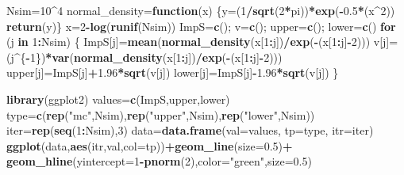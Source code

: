 \documentclass[]{book}
\newenvironment{Shaded}{\begin{snugshade}}{\end{snugshade}}
\newcommand{\KeywordTok}[1]{\textcolor[rgb]{0.13,0.29,0.53}{\textbf{#1}}}
\newcommand{\DataTypeTok}[1]{\textcolor[rgb]{0.13,0.29,0.53}{#1}}
\newcommand{\DecValTok}[1]{\textcolor[rgb]{0.00,0.00,0.81}{#1}}
\newcommand{\FloatTok}[1]{\textcolor[rgb]{0.00,0.00,0.81}{#1}}
\newcommand{\StringTok}[1]{\textcolor[rgb]{0.31,0.60,0.02}{#1}}
\newcommand{\ControlFlowTok}[1]{\textcolor[rgb]{0.13,0.29,0.53}{\textbf{#1}}}
\newcommand{\OperatorTok}[1]{\textcolor[rgb]{0.81,0.36,0.00}{\textbf{#1}}}
\newcommand{\NormalTok}[1]{#1}
\begin{document}
\begin{Shaded}
\begin{Highlighting}[]
\NormalTok{Nsim=}\DecValTok{10}\OperatorTok{^}\DecValTok{4}
\NormalTok{normal_density=}\ControlFlowTok{function}\NormalTok{(x)}
\NormalTok{\{y=(}\DecValTok{1}\OperatorTok{/}\KeywordTok{sqrt}\NormalTok{(}\DecValTok{2}\OperatorTok{*}\NormalTok{pi))}\OperatorTok{*}\KeywordTok{exp}\NormalTok{(}\OperatorTok{-}\FloatTok{0.5}\OperatorTok{*}\NormalTok{(x}\OperatorTok{^}\DecValTok{2}\NormalTok{))}
\KeywordTok{return}\NormalTok{(y)\}}
\NormalTok{x=}\DecValTok{2}\OperatorTok{-}\KeywordTok{log}\NormalTok{(}\KeywordTok{runif}\NormalTok{(Nsim))}
\NormalTok{ImpS=}\KeywordTok{c}\NormalTok{(); v=}\KeywordTok{c}\NormalTok{(); upper=}\KeywordTok{c}\NormalTok{(); lower=}\KeywordTok{c}\NormalTok{()}
\ControlFlowTok{for}\NormalTok{ (j }\ControlFlowTok{in} \DecValTok{1}\OperatorTok{:}\NormalTok{Nsim)}
\NormalTok{\{}
\NormalTok{ImpS[j]=}\KeywordTok{mean}\NormalTok{(}\KeywordTok{normal_density}\NormalTok{(x[}\DecValTok{1}\OperatorTok{:}\NormalTok{j])}\OperatorTok{/}\KeywordTok{exp}\NormalTok{(}\OperatorTok{-}\NormalTok{(x[}\DecValTok{1}\OperatorTok{:}\NormalTok{j]}\OperatorTok{-}\DecValTok{2}\NormalTok{)))}
\NormalTok{v[j]=(j}\OperatorTok{^}\NormalTok{\{}\OperatorTok{-}\DecValTok{1}\NormalTok{\})}\OperatorTok{*}\KeywordTok{var}\NormalTok{(}\KeywordTok{normal_density}\NormalTok{(x[}\DecValTok{1}\OperatorTok{:}\NormalTok{j])}\OperatorTok{/}\KeywordTok{exp}\NormalTok{(}\OperatorTok{-}\NormalTok{(x[}\DecValTok{1}\OperatorTok{:}\NormalTok{j]}\OperatorTok{-}\DecValTok{2}\NormalTok{)))}
\NormalTok{upper[j]=ImpS[j]}\OperatorTok{+}\FloatTok{1.96}\OperatorTok{*}\KeywordTok{sqrt}\NormalTok{(v[j])}
\NormalTok{lower[j]=ImpS[j]}\OperatorTok{-}\FloatTok{1.96}\OperatorTok{*}\KeywordTok{sqrt}\NormalTok{(v[j])}
\NormalTok{\}}

\KeywordTok{library}\NormalTok{(ggplot2)}
\NormalTok{values=}\KeywordTok{c}\NormalTok{(ImpS,upper,lower)}
\NormalTok{type=}\KeywordTok{c}\NormalTok{(}\KeywordTok{rep}\NormalTok{(}\StringTok{"mc"}\NormalTok{,Nsim),}\KeywordTok{rep}\NormalTok{(}\StringTok{"upper"}\NormalTok{,Nsim),}\KeywordTok{rep}\NormalTok{(}\StringTok{"lower"}\NormalTok{,Nsim))}
\NormalTok{iter=}\KeywordTok{rep}\NormalTok{(}\KeywordTok{seq}\NormalTok{(}\DecValTok{1}\OperatorTok{:}\NormalTok{Nsim),}\DecValTok{3}\NormalTok{)}
\NormalTok{data=}\KeywordTok{data.frame}\NormalTok{(}\DataTypeTok{val=}\NormalTok{values, }\DataTypeTok{tp=}\NormalTok{type, }\DataTypeTok{itr=}\NormalTok{iter)}
\KeywordTok{ggplot}\NormalTok{(data,}\KeywordTok{aes}\NormalTok{(itr,val,}\DataTypeTok{col=}\NormalTok{tp))}\OperatorTok{+}\KeywordTok{geom_line}\NormalTok{(}\DataTypeTok{size=}\FloatTok{0.5}\NormalTok{)}\OperatorTok{+}
\KeywordTok{geom_hline}\NormalTok{(}\DataTypeTok{yintercept=}\DecValTok{1}\OperatorTok{-}\KeywordTok{pnorm}\NormalTok{(}\DecValTok{2}\NormalTok{),}\DataTypeTok{color=}\StringTok{"green"}\NormalTok{,}\DataTypeTok{size=}\FloatTok{0.5}\NormalTok{)}
\end{Highlighting}
\end{Shaded}
\end{document}
